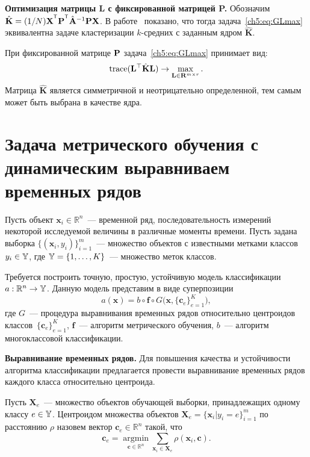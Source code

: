 \textbf{Оптимизация матрицы L с фиксированной матрицей P.}
Обозначим $\hat{\mathbf{K}} = (1/N)\bX^{\T} \bP^{\T} \hat{\mathbf{A}}^{-1} \bP \bX$.
В работе~\cite{shawe2004kernel} показано, что тогда задача~\eqref{ch5:eq:GLmax} эквивалентна задаче кластеризации $k$-средних с заданным ядром $\hat{\mathbf{K}}$.

При фиксированной матрице $\mathbf{P}$ задача~\eqref{ch5:eq:GLmax} принимает вид:
\begin{equation*}
	\text{trace} (\mathbf{L}^{\top} \hat{\mathbf{K}} \mathbf{L}) \to \max_{\mathbf{L} \in \mathbf{R}^{m \times r}}.
\end{equation*}
Матрица $\hat{\mathbf{K}}$ является симметричной и неотрицательно определенной, тем самым может быть выбрана в качестве ядра.

\section{Задача метрического обучения с динамическим выравниваем временных рядов}
\label{sec:ch5:metric_learning_classification}

Пусть объект $\mathbf{x}_i \in \mathbb{R}^n$~--- временной ряд, последовательность измерений некоторой исследуемой величины в различные моменты времени.
Пусть задана выборка $\{(\mathbf{x}_i, y_i)\}_{i=1}^m$~--- множество объектов с известными метками классов $y_i \in \mathbb{Y}$, где $\mathbb{Y} = \{1, \dots, K\}$~--- множество меток классов.

Требуется построить точную, простую, устойчивую модель классификации $a: \mathbb{R}^n \to \mathbb{Y}$.
Данную модель представим в виде суперпозиции
\begin{equation*}
	a(\mathbf{x}) = b \circ \mathbf{f} \circ G\bigl(\mathbf{x}, \{\mathbf{c}_e\}_{e = 1} ^ K\bigr),
\end{equation*}
где $G$~--- процедура выравнивания временных рядов относительно центроидов классов~$\{\mathbf{c}_e\}_{e = 1} ^ K$, $\mathbf{f}$~--- алгоритм метрического обучения, $b$~--- алгоритм многоклассовой классификации.

\textbf{Выравнивание временных рядов.}
Для повышения качества и устойчивости алгоритма классификации предлагается провести выравнивание временных рядов каждого класса относительно центроида.

Пусть $\mathbf{X}_e$~--- множество объектов обучающей выборки, принадлежащих одному классу $e \in \mathbb{Y}$.
Центроидом множества объектов $\mathbf{X}_e = \{\mathbf{x}_i|y_i=e\}_{i=1}^m$ по расстоянию $\rho$ назовем вектор $\mathbf{c}_e \in \mathbb{R}^n$ такой, что
\begin{equation}
	\label{ch5:eq:centroid_task}
	\mathbf{c}_e = \mathop{\text{argmin}}\limits_{{\mathbf{c} \in \mathbb{R}^n}}\sum_{\mathbf{x}_i \in \mathbf{X}_e}
	{\rho(\mathbf{x}_i ,\mathbf{c})}.
\end{equation}

